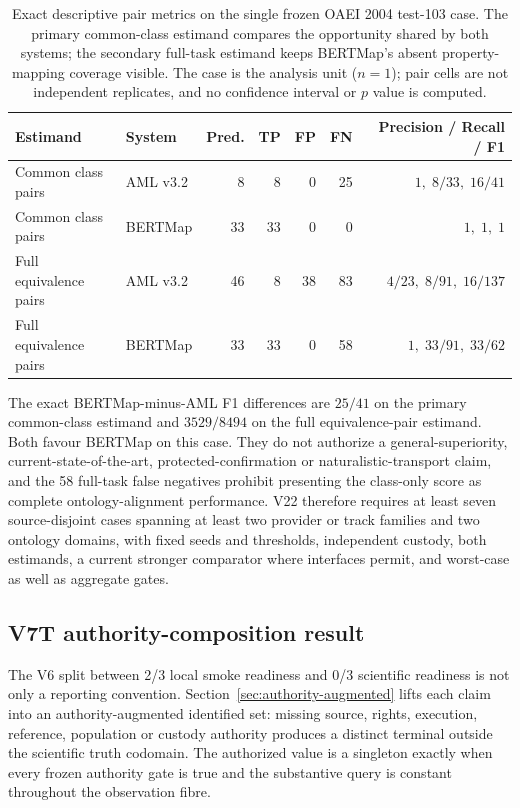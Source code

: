 \begin{table}[htbp]
\centering
\caption{Exact descriptive pair metrics on the single frozen OAEI 2004
test-103 case. The primary common-class estimand compares the opportunity
shared by both systems; the secondary full-task estimand keeps BERTMap's absent
property-mapping coverage visible. The case is the analysis unit ($n=1$); pair
cells are not independent replicates, and no confidence interval or $p$ value
is computed.}
\label{tab:p3-v21-one-case}
\begin{tabular}{llrrrrr}
\toprule
Estimand & System & Pred. & TP & FP & FN & Precision / Recall / F1 \\
\midrule
Common class pairs & AML v3.2 & 8 & 8 & 0 & 25 & $1,\;8/33,\;16/41$ \\
Common class pairs & BERTMap & 33 & 33 & 0 & 0 & $1,\;1,\;1$ \\
Full equivalence pairs & AML v3.2 & 46 & 8 & 38 & 83 & $4/23,\;8/91,\;16/137$ \\
Full equivalence pairs & BERTMap & 33 & 33 & 0 & 58 & $1,\;33/91,\;33/62$ \\
\bottomrule
\end{tabular}
\end{table}

The exact BERTMap-minus-AML F1 differences are $25/41$ on the primary
common-class estimand and $3529/8494$ on the full equivalence-pair estimand.
Both favour BERTMap on this case. They do not authorize a general-superiority,
current-state-of-the-art, protected-confirmation or naturalistic-transport
claim, and the 58 full-task false negatives prohibit presenting the class-only
score as complete ontology-alignment performance. V22 therefore requires at
least seven source-disjoint cases spanning at least two provider or track
families and two ontology domains, with fixed seeds and thresholds, independent
custody, both estimands, a current stronger comparator where interfaces permit,
and worst-case as well as aggregate gates.

\subsection{V7T authority-composition result}

The V6 split between 2/3 local smoke readiness and 0/3 scientific readiness is
not only a reporting convention.  Section~\ref{sec:authority-augmented} lifts
each claim into an authority-augmented identified set: missing source, rights,
execution, reference, population or custody authority produces a distinct
terminal outside the scientific truth codomain.  The authorized value is a
singleton exactly when every frozen authority gate is true and the substantive
query is constant throughout the observation fibre.

